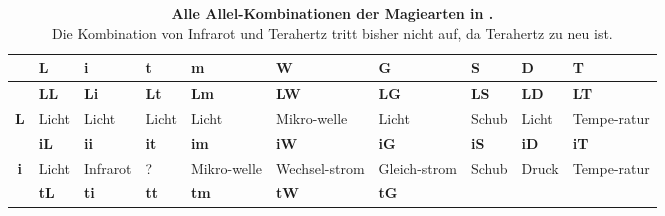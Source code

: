 \begin{landscape}
\begin{table}[hbt]
	\centering
	\caption[Alle Allel-Kombinationen der Magiearten in ]%
	{\textbf{Alle Allel-Kombinationen der Magiearten in .} \\
	Die Kombination von Infrarot und Terahertz tritt bisher nicht auf, da Terahertz zu neu ist.} 
	\label{tab:landmagievererbung}
	\begin{threeparttable}
		\begin{tabularx}{\linewidth}{c|XXXXXXXXX} \toprule
			\textbf{} &
			\textbf{L} &
			\textbf{i} &
			\textbf{t} &
			\textbf{m} &
			\textbf{W} &
			\textbf{G} &
			\textbf{S} &
			\textbf{D} &
			\textbf{T} \\ \midrule
			&
			\cellcolor[HTML]{32CB00}\textbf{LL} &
			\cellcolor[HTML]{32CB00}\textbf{Li} &
			\cellcolor[HTML]{32CB00}\textbf{Lt} &
			\cellcolor[HTML]{32CB00}\textbf{Lm} &
			\cellcolor[HTML]{38FFF8}\textbf{LW} &
			\cellcolor[HTML]{32CB00}\textbf{LG} &
			\cellcolor[HTML]{F8FF00}\textbf{LS} &
			\cellcolor[HTML]{32CB00}\textbf{LD} &
			\cellcolor[HTML]{FB0404}\textbf{LT} \\
			\multirow{-2}{*}{\textbf{L}} &
			\cellcolor[HTML]{32CB00}Licht &
			\cellcolor[HTML]{32CB00}Licht &
			\cellcolor[HTML]{32CB00}Licht &
			\cellcolor[HTML]{32CB00}Licht &
			\cellcolor[HTML]{38FFF8}Mikro-welle &
			\cellcolor[HTML]{32CB00}Licht &
			\cellcolor[HTML]{F8FF00}Schub &
			\cellcolor[HTML]{32CB00}Licht &
			\cellcolor[HTML]{FB0404}Tempe-ratur \\
			&
			\cellcolor[HTML]{32CB00}\textbf{iL} &
			\cellcolor[HTML]{9AFF99}\textbf{ii} &
			\textbf{it} &
			\cellcolor[HTML]{38FFF8}\textbf{im} &
			\cellcolor[HTML]{54C1F2}\textbf{iW} &
			\cellcolor[HTML]{4156EE}\textbf{iG} &
			\cellcolor[HTML]{F8FF00}\textbf{iS} &
			\cellcolor[HTML]{FFCB2F}\textbf{iD} &
			\cellcolor[HTML]{FB0404}\textbf{iT} \\
			\multirow{-2}{*}{\textbf{i}} &
			\cellcolor[HTML]{32CB00}Licht &
			\cellcolor[HTML]{9AFF99}Infrarot &
			? &
			\cellcolor[HTML]{38FFF8}Mikro-welle &
			\cellcolor[HTML]{54C1F2}Wechsel-strom &
			\cellcolor[HTML]{4156EE}Gleich-strom &
			\cellcolor[HTML]{F8FF00}Schub &
			\cellcolor[HTML]{FFCB2F}Druck &
			\cellcolor[HTML]{FB0404}Tempe-ratur \\
			&
			\cellcolor[HTML]{32CB00}\textbf{tL} &
			\textbf{ti} &
			\cellcolor[HTML]{00D288}\textbf{tt} &
			\cellcolor[HTML]{38FFF8}\textbf{tm} &
			\cellcolor[HTML]{54C1F2}\textbf{tW} &
			\cellcolor[HTML]{4156EE}\textbf{tG} &

\end{tabularx}
\end{threeparttable}
\end{table}
\end{landscape}
